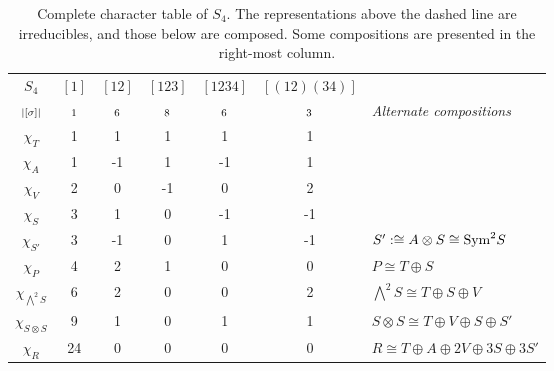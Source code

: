 \begin{table}[hbt!]
	\centering
	\begin{tabular}{c | c c c c c | l}
		       $S_4$         & $[1]$   & $[12]$  & $[123]$ & $[1234]$ & $[(12)(34)]$ &                                                              \\
		  $\scriptstyle|[\sigma]|$    & $\scriptstyle 1$ & $\scriptstyle 6$ & $\scriptstyle 8$ & $\scriptstyle 6$  & $\scriptstyle 3$      & \textit{Alternate compositions}                              \\ \hline
		      $\chi_T$       & 1       & 1       & 1       & 1        & 1            &                                                              \\
		      $\chi_A$       & 1       & -1      & 1       & -1       & 1            &                                                              \\
		      $\chi_V$       & 2       & 0       & -1      & 0        & 2            &                                                              \\
		      $\chi_S$       & 3       & 1       & 0       & -1       & -1           &                                                              \\
		$\chi_{S'}$ & 3       & -1      & 0       & 1        & -1           & $S' :\cong A \otimes S \cong \text{Sym}^2S$                                  \\ \hline\hline
		      $\chi_P$       & 4       & 2       & 1       & 0        & 0            & $P \cong T \oplus S$                                         \\
		   $\chi_{\bigwedge^2S}$    & 6       & 2       & 0       & 0        & 2            & $\bigwedge^2S \cong T \oplus S \oplus V$                     \\
		$\chi_{S \otimes S}$ & 9       & 1       & 0       & 1        & 1            & $S \otimes S \cong T \oplus V \oplus S \oplus S'$ \\
		      $\chi_R$       & 24      & 0       & 0       & 0        & 0            & $R \cong T \oplus A \oplus 2V \oplus 3S \oplus 3S'$
	\end{tabular}
	\caption{Complete character table of $S_4$. The representations above the dashed line are irreducibles, and those below are composed. Some compositions are presented in the right-most column.}
	\label{table:completecharS4}
\end{table}
